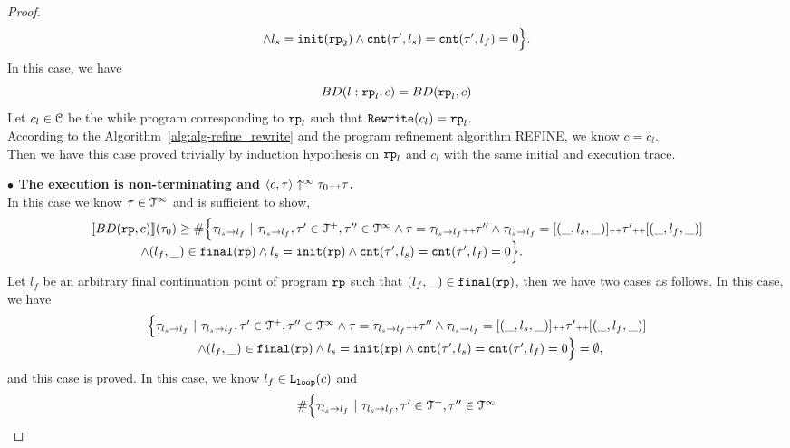 \begin{proof}
\[\begin{array}{l}
    \land l_s = \mathtt{init}(\mathtt{rp}_2)
    \land \mathtt{cnt}(\mathtt{\tau}', l_s) = \mathtt{cnt}(\mathtt{\tau}', l_f) = 0 
    \Big\}.
    \end{array}
\]
In this case, we have
\[
  BD(l: \mathtt{rp}_l, c) = BD(\mathtt{rp}_l, c)
\]
Let $c_l \in \mathcal{C}$ be the while program corresponding to $\mathtt{rp}_l$ such that $\mathtt{Rewrite}(c_l) = \mathtt{rp}_l$.
\\
According to the Algorithm~\ref{alg:alg-refine_rewrite} and the program refinement algorithm REFINE, we know
$c = c_l$.
\\
Then we have this case proved trivially by induction hypothesis on $\mathtt{rp}_l$ and $c_l$ with the same initial and execution trace.

\textbf{$\bullet$ The execution is non-terminating and {$\langle {c}, \mathtt{\tau} \rangle \uparrow^{\infty} \mathtt{\tau}_0 {\scriptscriptstyle ++} \mathtt{\tau}$}.} 
\\
 In this case we know $\mathtt{\tau} \in \mathcal{T}^{\infty}$ and is sufficient to show,
 \[
  \begin{array}{l}
  \llbracket BD(\mathtt{rp}, c) \rrbracket(\mathtt{\tau}_0) \geq
  \# \Big\{\mathtt{\tau}_{l_s \to l_f} ~\vert~ \mathtt{\tau}_{l_s \to l_f}, \mathtt{\tau}'\in \mathcal{T}^{+}, \mathtt{\tau}''\in \mathcal{T}^{\infty}
  \land \mathtt{\tau} = \mathtt{\tau}_{l_s \to l_f} {\scriptscriptstyle ++} \mathtt{\tau}''
  \land \mathtt{\tau}_{l_s \to l_f} = [(\_, l_s, \_)] {\scriptscriptstyle ++} \mathtt{\tau}' {\scriptscriptstyle ++} [(\_, l_f, \_)]
\\ \qquad \qquad
  \land (l_{f}, \_) \in \mathtt{final}(\mathtt{rp})
  \land l_s = \mathtt{init}(\mathtt{rp})
  \land \mathtt{cnt}(\mathtt{\tau}', l_s) = \mathtt{cnt}(\mathtt{\tau}', l_f) = 0 
  \Big\}.
  \end{array}
\]
Let $l_f$ be an arbitrary final continuation point of program $\mathtt{rp}$ such that $(l_{f}, \_) \in \mathtt{final}(\mathtt{rp})$,
then we have two cases as follows.
In this case, we have 
\[
  \begin{array}{l}
  \Big\{\mathtt{\tau}_{l_s \to l_f} ~\vert~ \mathtt{\tau}_{l_s \to l_f}, \mathtt{\tau}'\in \mathcal{T}^{+}, \mathtt{\tau}''\in \mathcal{T}^{\infty}
    \land \mathtt{\tau} = \mathtt{\tau}_{l_s \to l_f} {\scriptscriptstyle ++} \mathtt{\tau}''
    \land \mathtt{\tau}_{l_s \to l_f} = [(\_, l_s, \_)] {\scriptscriptstyle ++} \mathtt{\tau}' {\scriptscriptstyle ++} [(\_, l_f, \_)]
    \\ \qquad \qquad
  \land (l_{f}, \_) \in \mathtt{final}(\mathtt{rp})
  \land l_s = \mathtt{init}(\mathtt{rp})
  \land \mathtt{cnt}(\mathtt{\tau}', l_s) = \mathtt{cnt}(\mathtt{\tau}', l_f) = 0 
  \Big\} = \emptyset,
  \end{array}
\]
and this case is proved.
In this case, we know $l_f \in \mathtt{L}_{\mathtt{loop}}(c)$ and 
\[
  \begin{array}{l}
    \# \Big\{\mathtt{\tau}_{l_s \to l_f} ~\vert~ \mathtt{\tau}_{l_s \to l_f}, \mathtt{\tau}'\in \mathcal{T}^{+}, \mathtt{\tau}''\in \mathcal{T}^{\infty}

\end{array}\]
\end{proof}
